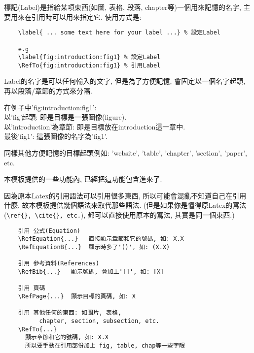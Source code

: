 標記(Label)是指給某項東西(如圖, 表格, 段落, chapter等)一個用來記憶的名字, 主要用來在引用時可以用來指定它. 使用方式是:

  \EmptyLine
  \begin{fmpage}{\textwidth}
  \begin{verbatim}
    \label{ ... some text here for your label ...} % 設定Label

    e.g
    \label{fig:introduction:fig1} % 設定Label
    \RefTo{fig:introduction:fig1} % 引用Label
  \end{verbatim}
  \end{fmpage}
  \EmptyLine

Label的名字是可以任何輸入的文字, 但是為了方便記憶, 會固定以一個名字起頭, 再以段落/章節的方式來分隔.

\noindent 在例子中'fig:introduction:fig1':\\
以'fig'起頭: 即是目標是一張圖像(figure).\\
以'introduction'為章節: 即是目標放在introduction這一章中.\\
最後'fig1': 這張圖像的名字為'fig1'.

同樣其他方便記憶的目標起頭例如: 'website', 'table', 'chapter', 'section', 'paper', etc.

本模板提供的一些功能內, 已經把這功能包含進來了.

\newpage
{}
因為原本Latex的引用語法可以引用很多東西, 所以可能會混亂不知道自己在引用什麼, 故本模板提供幾個語法來取代那些語法. (但是如果你是懂得原Latex的寫法(\verb|\ref{}, \cite{}, etc.|), 都可以直接使用原本的寫法, 其實是同一個東西.)

  \EmptyLine
  \begin{fmpage}{\textwidth}
  \begin{verbatim}
    引用 公式(Equation)
    \RefEquation{...}   直接顯示章節和它的號碼, 如: X.X
    \RefEquationB{...}  顯示時多了'()', 如: (X.X)

    引用 參考資料(References)
    \RefBib{...}   顯示號碼, 會加上'[]', 如: [X]

    引用 頁碼
    \RefPage{...}  顯示目標的頁碼, 如: X

    引用 其他任何的東西: 如圖片, 表格,
          chapter, section, subsection, etc.
    \RefTo{...}
      顯示章節和它的號碼, 如: X.X
      所以要手動在引用部份加上 fig, table, chap等一些字眼
  \end{verbatim}
  \end{fmpage}

